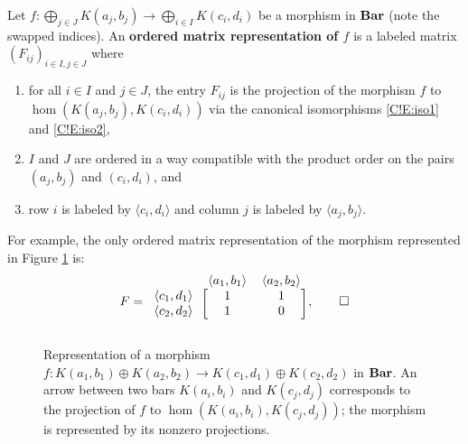\begin{definition}
\label{C!D:matrix}
  Let $f \colon \bigoplus_{j \in J} K(a_j, b_j) \to \bigoplus_{i \in I} K(c_i, d_i)$ be a morphism in $\Bar$ (note the swapped indices). An \textbf{ordered matrix representation of $f$} is a labeled matrix $(F_{ij})_{i \in I, j \in J}$ where
  \begin{enumerate}
    \item for all $i \in I$ and $j \in J$, the entry $F_{ij}$ is the projection of the morphism $f$ to $\hom(K(a_j, b_j), K(c_i, d_i))$ via the canonical isomorphisms \eqref{C!E:iso1} and \eqref{C!E:iso2},
    \item $I$ and $J$ are ordered in a way compatible with the product order on the pairs $(a_j, b_j)$ and $(c_i, d_i)$, and
    \item row $i$ is labeled by $\langle c_i, d_i \rangle$ and column $j$ is labeled by $\langle a_j, b_j \rangle$. \qedhere
  \end{enumerate}
\end{definition}

\begin{example}
  For example, the only ordered matrix representation of the morphism represented in Figure \ref{C!fig:morphism_in_Bar} is:
  \[
    F = \begin{blockarray}{c cc}
      & \langle a_1,b_1 \rangle & \langle a_2,b_2 \rangle \\
      \begin{block}{c [cc]}
        \langle c_1,d_1 \rangle & 1 & 1 \\
        \langle c_2,d_2 \rangle & 1 & 0 \\
      \end{block}
    \end{blockarray},
    \qedhere
  \]
\end{example}

\begin{figure}[tbp]
  \centering
  \caption{Representation of a morphism $f \colon K(a_1,b_1) \oplus K(a_2,b_2) \rightarrow K(c_1,d_1) \oplus K(c_2,d_2)$ in $\Bar$. An arrow between two bars $K(a_i,b_i)$ and $K(c_j,d_j)$ corresponds to the projection of $f$ to $\hom(K(a_i, b_i), K(c_j, d_j))$; the morphism is represented by its nonzero projections.}
  \label{C!fig:morphism_in_Bar}
\end{figure}


